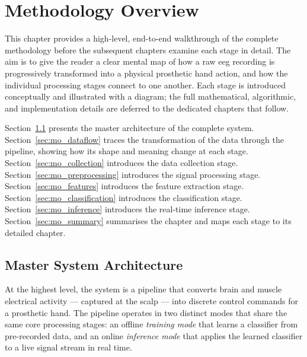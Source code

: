 \chapter{Methodology Overview}
\label{ch:methodology}

This chapter provides a high-level, end-to-end walkthrough of the
complete methodology before the subsequent chapters examine each
stage in detail. The aim is to give the reader a clear mental map
of how a raw \acrshort{eeg} recording is progressively transformed
into a physical prosthetic hand action, and how the individual
processing stages connect to one another. Each stage is introduced
conceptually and illustrated with a diagram; the full mathematical,
algorithmic, and implementation details are deferred to the
dedicated chapters that follow.

Section~\ref{sec:mo_master} presents the master architecture of the
complete system. Section~\ref{sec:mo_dataflow} traces the
transformation of the data through the pipeline, showing how its
shape and meaning change at each stage.
Section~\ref{sec:mo_collection} introduces the data collection
stage. Section~\ref{sec:mo_preprocessing} introduces the signal
processing stage. Section~\ref{sec:mo_features} introduces the
feature extraction stage. Section~\ref{sec:mo_classification}
introduces the classification stage. Section~\ref{sec:mo_inference}
introduces the real-time inference stage.
Section~\ref{sec:mo_summary} summarises the chapter and maps each
stage to its detailed chapter.

\section{Master System Architecture}
\label{sec:mo_master}

At the highest level, the system is a pipeline that converts brain
and muscle electrical activity --- captured at the scalp --- into
discrete control commands for a prosthetic hand. The pipeline
operates in two distinct modes that share the same core processing
stages: an offline \emph{training mode} that learns a classifier
from pre-recorded data, and an online \emph{inference mode} that
applies the learned classifier to a live signal stream in real
time.

